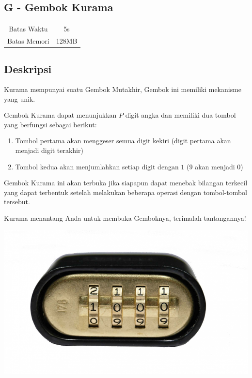 \documentclass{article}
\begin{document}
\begin{center}
    \section*{G - Gembok Kurama} %

    \begin{tabular}{ | c c | }
        \hline
        Batas Waktu  & 5s \\    %
        Batas Memori & 128MB \\  %
        \hline
    \end{tabular}
\end{center}

\subsection*{Deskripsi}

Kurama mempunyai suatu Gembok Mutakhir, Gembok ini memiliki mekanisme yang unik. 

Gembok Kurama dapat menunjukkan $P$ digit angka dan memiliki dua tombol yang berfungsi sebagai berikut:

\begin{enumerate}
\item{Tombol pertama akan menggeser semua digit kekiri (digit pertama akan menjadi digit terakhir)}
\item{Tombol kedua akan menjumlahkan setiap 
digit dengan $1$ ($9$ akan menjadi $0$)}
\end{enumerate}

Gembok Kurama ini akan terbuka jika siapapun dapat 
menebak bilangan terkecil yang dapat terbentuk setelah melakukan beberapa operasi dengan 
tombol-tombol tersebut.

Kurama menantang Anda untuk membuka Gemboknya, terimalah tantangannya!

\begin{center}
\includegraphics[scale=0.2]{gembok.png}
\end{center}
\end{document}
